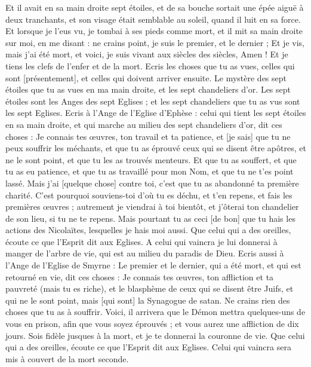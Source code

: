 \begin{multicols}{2}
Et il avait en sa main droite sept étoiles, et de sa bouche sortait une épée aiguë à deux tranchants, et son visage était semblable au soleil, quand il luit en sa force.
Et lorsque je l'eus vu, je tombai à ses pieds comme mort, et il mit sa main droite sur moi, en me disant : ne crains point, je suis le premier, et le dernier ;
Et je vis, mais j'ai été mort, et voici, je suis vivant aux siècles des siècles, Amen ! Et je tiens les clefs de l'enfer et de la mort.
Ecris les choses que tu as vues, celles qui sont [présentement], et celles qui doivent arriver ensuite.
Le mystère des sept étoiles que tu as vues en ma main droite, et les sept chandeliers d'or. Les sept étoiles sont les Anges des sept Eglises ; et les sept chandeliers que tu as vus sont les sept Eglises.
\VerseOne{}Ecris à l'Ange de l'Eglise d'Ephèse : celui qui tient les sept étoiles en sa main droite, et qui marche au milieu des sept chandeliers d'or, dit ces choses :
Je connais tes œuvres, ton travail et ta patience, et [je sais] que tu ne peux souffrir les méchants, et que tu as éprouvé ceux qui se disent être apôtres, et ne le sont point, et que tu les as trouvés menteurs.
Et que tu as souffert, et que tu as eu patience, et que tu as travaillé pour mon Nom, et que tu ne t'es point lassé.
Mais j'ai [quelque chose] contre toi, c'est que tu as abandonné ta première charité.
C'est pourquoi souviens-toi d'où tu es déchu, et t'en repens, et fais les premières œuvres ; autrement je viendrai à toi bientôt, et j'ôterai ton chandelier de son lieu, si tu ne te repens.
Mais pourtant tu as ceci [de bon] que tu hais les actions des Nicolaïtes, lesquelles je hais moi aussi.
Que celui qui a des oreilles, écoute ce que l'Esprit dit aux Eglises. A celui qui vaincra je lui donnerai à manger de l'arbre de vie, qui est au milieu du paradis de Dieu.
Ecris aussi à l'Ange de l'Eglise de Smyrne : Le premier et le dernier, qui a été mort, et qui est retourné en vie, dit ces choses :
Je connais tes œuvres, ton affliction et ta pauvreté (mais tu es riche), et le blasphème de ceux qui se disent être Juifs, et qui ne le sont point, mais [qui sont] la Synagogue de satan.
Ne crains rien des choses que tu as à souffrir. Voici, il arrivera que le Démon mettra quelques-uns de vous en prison, afin que vous soyez éprouvés ; et vous aurez une affliction de dix jours. Sois fidèle jusques à la mort, et je te donnerai la couronne de vie.
Que celui qui a des oreilles, écoute ce que l'Esprit dit aux Eglises. Celui qui vaincra sera mis à couvert de la mort seconde.

\end{multicols}

